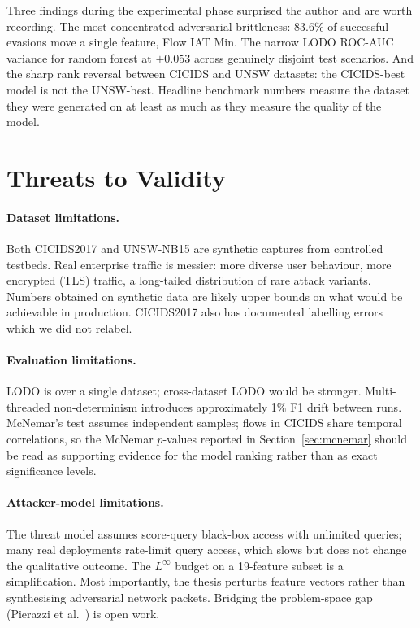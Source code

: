 Three findings during the experimental phase surprised the author and
are worth recording. The most concentrated adversarial brittleness:
83.6\% of successful evasions move a single feature, Flow IAT Min. The
narrow LODO ROC-AUC variance for random forest at $\pm 0.053$ across
genuinely disjoint test scenarios. And the sharp rank reversal between
CICIDS and UNSW datasets: the CICIDS-best model is not the UNSW-best.
Headline benchmark numbers measure the dataset they were generated on at
least as much as they measure the quality of the model.

\section{Threats to Validity}

\paragraph{Dataset limitations.} Both CICIDS2017 and UNSW-NB15 are
synthetic captures from controlled testbeds. Real enterprise traffic is
messier: more diverse user behaviour, more encrypted (TLS) traffic, a
long-tailed distribution of rare attack variants. Numbers obtained on
synthetic data are likely upper bounds on what would be achievable in
production. CICIDS2017 also has documented labelling
errors~\cite{Engelen2021} which we did not relabel.

\paragraph{Evaluation limitations.} LODO is over a single dataset;
cross-dataset LODO would be stronger. Multi-threaded non-determinism
introduces approximately 1\% F1 drift between runs. McNemar's test
assumes independent samples; flows in CICIDS share temporal
correlations, so the McNemar $p$-values reported in
Section~\ref{sec:mcnemar} should be read as supporting evidence for the
model ranking rather than as exact significance levels.

\paragraph{Attacker-model limitations.} The threat model assumes
score-query black-box access with unlimited queries; many real
deployments rate-limit query access, which slows but does not change the
qualitative outcome. The $L^\infty$ budget on a 19-feature subset is a
simplification. Most importantly, the thesis perturbs feature vectors
rather than synthesising adversarial network packets. Bridging the
problem-space gap (Pierazzi et al.~\cite{Pierazzi2020}) is open work.

